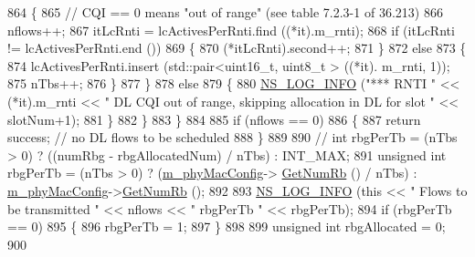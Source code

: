 \begin{DoxyCode}
{864                         \{
865                                 \textcolor{comment}{// CQI == 0 means "out of range" (see table 7.2.3-1 of 36.213)}
866                                 nflows++;
867                                 itLcRnti = lcActivesPerRnti.find ((*it).m\_rnti);
868                                 \textcolor{keywordflow}{if} (itLcRnti != lcActivesPerRnti.end ())
869                                 \{
870                                         (*itLcRnti).second++;
871                                 \}
872                                 \textcolor{keywordflow}{else}
873                                 \{
874                                         lcActivesPerRnti.insert (std::pair<uint16\_t, uint8\_t > ((*it).
      m\_rnti, 1));
875                                         nTbs++;
876                                 \}
877                         \}
878                         \textcolor{keywordflow}{else}
879                         \{
880                                 \hyperlink{group__logging_gafbd73ee2cf9f26b319f49086d8e860fb}{NS\_LOG\_INFO} (\textcolor{stringliteral}{"*** RNTI "} << (*it).m\_rnti << \textcolor{stringliteral}{" DL CQI out of
       range, skipping allocation in DL for slot "} << slotNum+1);
881                         \}
882                 \}
883         \}
884 
885         \textcolor{keywordflow}{if} (nflows == 0)
886         \{
887                 \textcolor{keywordflow}{return} success; \textcolor{comment}{// no DL flows to be scheduled}
888         \}
889 
890         \textcolor{comment}{// int rbgPerTb = (nTbs > 0) ? ((numRbg - rbgAllocatedNum) / nTbs) : INT\_MAX;}
891         \textcolor{keywordtype}{unsigned} \textcolor{keywordtype}{int} rbgPerTb = (nTbs > 0) ? (\hyperlink{classns3_1_1MmWaveMacScheduler_a24d7af4971d2e500fe543cefbafa2fd9}{m\_phyMacConfig}->
      \hyperlink{classns3_1_1MmWavePhyMacCommon_a4c5f323fd722d6eec52efda5d76f97ad}{GetNumRb} ()  / nTbs) : \hyperlink{classns3_1_1MmWaveMacScheduler_a24d7af4971d2e500fe543cefbafa2fd9}{m\_phyMacConfig}->\hyperlink{classns3_1_1MmWavePhyMacCommon_a4c5f323fd722d6eec52efda5d76f97ad}{GetNumRb} ();
892 
893         \hyperlink{group__logging_gafbd73ee2cf9f26b319f49086d8e860fb}{NS\_LOG\_INFO} (\textcolor{keyword}{this} << \textcolor{stringliteral}{" Flows to be transmitted "} << nflows << \textcolor{stringliteral}{" rbgPerTb "} << rbgPerTb);
894         \textcolor{keywordflow}{if} (rbgPerTb == 0)
895         \{
896                 rbgPerTb = 1;
897         \}
898 
899         \textcolor{keywordtype}{unsigned} \textcolor{keywordtype}{int} rbgAllocated = 0;
900 
}
\end{DoxyCode}
